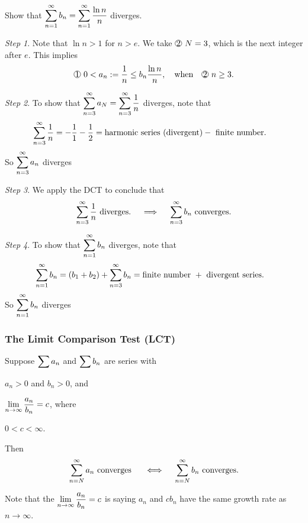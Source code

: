 \begin{ex} Show that $\displaystyle\sum_{n=1}^\infty b_n = \displaystyle\sum_{n=1}^\infty  \dfrac{\ln n}{n}$ diverges.

\textit{Step 1}. Note that $\ln n > 1$ for $n > e$. We take $\circled{2}~N=3$, which is the next integer after $e$. This implies 
\[ \circled{1}~0 < a_n := \dfrac{1}{n} \leq b_n \dfrac{\ln n}{n},\quad \text{when} \quad \circled{2}~n \geq 3.\]

\textit{Step 2}. To show that $\displaystyle\sum_{n=3}^\infty a_N = \displaystyle\sum_{n=3}^\infty \dfrac{1}{n}$ diverges, note that 
\begin{align*}
    \displaystyle\sum_{n=3}^\infty \dfrac{1}{n} &=  - \dfrac{1}{1} - \dfrac{1}{2} = \text{harmonic series (divergent)} - \text{ finite number}.
\end{align*}
So $\displaystyle\sum_{n=3}^\infty a_n$ diverges


\textit{Step 3}. We apply the DCT to conclude that
\[\displaystyle\sum_{n=3}^\infty  \dfrac{1}{n} \text{ diverges}. \quad \implies \quad \displaystyle\sum_{n=3}^\infty b_n \text{ converges}.\]


\textit{Step 4}. To show that $\displaystyle\sum_{n=1}^\infty b_n$ diverges, note that 
\begin{align*}
    \displaystyle\sum_{n=1}^\infty b_n &= (b_1 + b_2) + \displaystyle\sum_{n=3}^\infty b_n = \text{finite number } +  \text{ divergent series}.
\end{align*}
So $\displaystyle\sum_{n=1}^\infty b_n$ diverges
\end{ex}



\subsubsection{The Limit Comparison Test (LCT)}
\begin{thm}
    Suppose $\displaystyle\sum a_n$ and $\displaystyle\sum b_n$ are series with \begin{enumerate*}[label = \circled{\arabic*}]
        \item $a_n > 0$ and $b_n > 0$, and
        \item $\displaystyle\lim_{n \to \infty} \dfrac{a_n}{b_n} = c$, where 
        \item $0 < c < \infty$.
    \end{enumerate*}
    Then  
    \[\displaystyle\sum_{n=N}^\infty a_n \text{ converges } \quad \iff \quad \displaystyle\sum_{n=N}^\infty b_n \text{ converges}.\]
\end{thm}

\begin{rmk}
    Note that the $\displaystyle\lim_{n \to \infty} \dfrac{a_n}{b_n} = c$ is saying $a_n$ and $cb_n$ have the same growth rate as $n \to \infty$.
\end{rmk}


